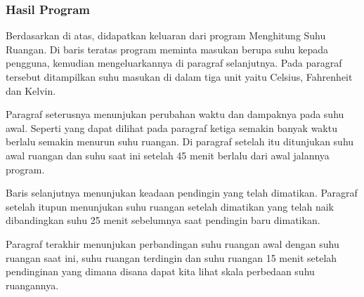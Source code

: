 \documentclass[../main.tex]{subfiles}
\begin{document}
    \subsubsection{{\Flowchart}}

    \subsubsection{{\SourceCode}}
    \begin{indentlevel0}
        
        
    \end{indentlevel0}

    \subsubsection{Hasil Program}

    \begin{indentlevel0}
        \ilz{}Berdasarkan  di atas, didapatkan keluaran dari program Menghitung Suhu Ruangan. Di baris teratas program meminta masukan berupa suhu kepada pengguna, kemudian mengeluarkannya di paragraf selanjutnya. Pada paragraf tersebut ditampilkan suhu masukan di dalam tiga unit yaitu Celsius, Fahrenheit dan Kelvin.

        \ilz{}Paragraf seterusnya menunjukan perubahan waktu dan dampaknya pada suhu awal. Seperti yang dapat dilihat pada paragraf ketiga semakin banyak waktu berlalu semakin menurun suhu ruangan. Di paragraf setelah itu ditunjukan suhu awal ruangan dan suhu saat ini setelah 45 menit berlalu dari awal jalannya program.

        \ilz{}Baris selanjutnya menunjukan keadaan pendingin yang telah dimatikan. Paragraf setelah itupun menunjukan suhu ruangan setelah dimatikan yang telah naik dibandingkan suhu 25 menit sebelumnya saat pendingin baru dimatikan.

        \ilz{}Paragraf terakhir menunjukan perbandingan suhu ruangan awal dengan suhu ruangan saat ini, suhu ruangan terdingin dan suhu ruangan 15 menit setelah pendinginan yang dimana disana dapat kita lihat skala perbedaan suhu ruangannya.
    \end{indentlevel0}
    
\end{document}
